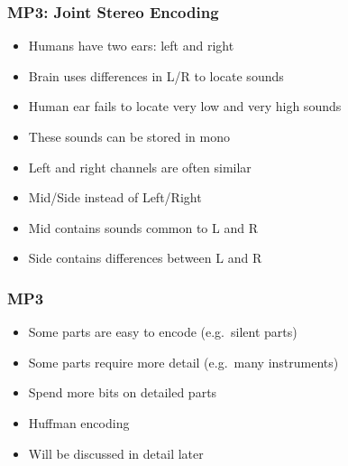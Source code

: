 \begin{frame}
  \frametitle{MP3: Joint Stereo Encoding}
  \begin{itemize}
    \item Humans have two ears: left and right
    \item Brain uses differences in L/R to locate sounds
    \item Human ear fails to locate very low and very high sounds
    \item These sounds can be stored in mono
  \end{itemize}
  \vskip5mm
  \begin{itemize}
    \item Left and right channels are often similar
    \item Mid/Side instead of Left/Right
    \item Mid contains sounds common to L and R
    \item Side contains differences between L and R
  \end{itemize}
\end{frame}

\begin{frame}
  \frametitle{MP3}
  \begin{itemize}
    \item Some parts are easy to encode (e.g.\ silent parts)
    \item Some parts require more detail (e.g.\ many instruments)
    \item Spend more bits on detailed parts
  \end{itemize}
  \vskip5mm
  \begin{itemize}
    \item Huffman encoding
    \item Will be discussed in detail later
  \end{itemize}
\end{frame}




